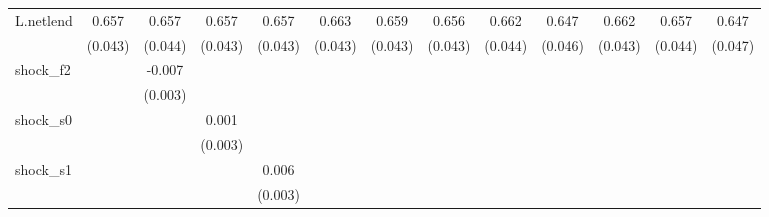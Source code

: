 {\begin{tabular}{l*{12}{c}}
\addlinespace
L.netlend   &       0.657\sym{***}&       0.657\sym{***}&       0.657\sym{***}&       0.657\sym{***}&       0.663\sym{***}&       0.659\sym{***}&       0.656\sym{***}&       0.662\sym{***}&       0.647\sym{***}&       0.662\sym{***}&       0.657\sym{***}&       0.647\sym{***}\\
            &     (0.043)         &     (0.044)         &     (0.043)         &     (0.043)         &     (0.043)         &     (0.043)         &     (0.043)         &     (0.044)         &     (0.046)         &     (0.043)         &     (0.044)         &     (0.047)         \\
\addlinespace
shock\_f2    &                     &      -0.007\sym{**} &                     &                     &                     &                     &                     &                     &                     &                     &                     &                     \\
            &                     &     (0.003)         &                     &                     &                     &                     &                     &                     &                     &                     &                     &                     \\
\addlinespace
shock\_s0    &                     &                     &       0.001         &                     &                     &                     &                     &                     &                     &                     &                     &                     \\
            &                     &                     &     (0.003)         &                     &                     &                     &                     &                     &                     &                     &                     &                     \\
\addlinespace
shock\_s1    &                     &                     &                     &       0.006         &                     &                     &                     &                     &                     &                     &                     &                     \\
            &                     &                     &                     &     (0.003)         &                     &                     &                     &                     &                     &                     &                     &                     \\

\end{tabular}}
